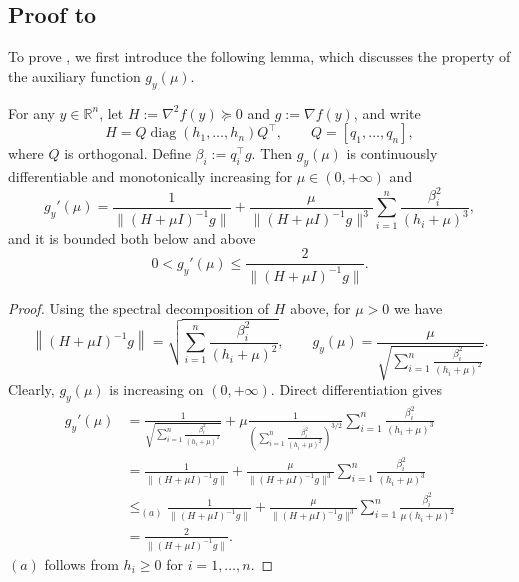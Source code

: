 \documentclass{article}
\begin{document}
\subsection*{Proof to }
To prove , we first introduce the following lemma, which discusses the property of the auxiliary function $g_y(\mu)$.
\begin{lemma}
    \label{lem.property g}
    For any $y\in \mathbb{R}^n$, let $H:=\nabla^2 f(y)\succeq0$ and $g:=\nabla f(y)$, and write
    \[
        H=Q\operatorname{diag}(h_1,\ldots,h_n)Q^\top,
        \qquad Q=[q_1,\ldots,q_n],
    \]
    where $Q$ is orthogonal. Define $\beta_i:=q_i^\top g$. Then $g_y(\mu)$ is continuously differentiable and monotonically increasing for $\mu \in \left(0,+\infty\right)$ and
    \begin{equation}
        \label{eq.derivative}
        g_y'(\mu) = \frac{1}{\|\left(H+\mu I\right)^{-1}g\|}+\frac{\mu}{\|\left(H+\mu I\right)^{-1}g\|^3}\sum_{i=1}^n\frac{\beta_i^2}{(h_i+\mu)^3},
    \end{equation}
    and it is bounded both below and above
    \begin{equation}
        \label{eq.derivative bound}
        0< g_y'(\mu) \leq \frac{2}{\|\left(H+\mu I\right)^{-1}g\|}.
    \end{equation}
\end{lemma}
\begin{proof}
    Using the spectral decomposition of $H$ above, for $\mu>0$ we have
    \begin{equation*}
        \left\|(H+\mu I)^{-1}g\right\|=\sqrt{\sum_{i=1}^n \frac{\beta_i^2}{(h_i+\mu)^2}}, \qquad g_y(\mu) = \frac{\mu}{\sqrt{\sum_{i=1}^n \frac{\beta_i^2}{(h_i+\mu)^2}}}.
    \end{equation*}
    Clearly, $g_y(\mu)$ is increasing on $\left(0,+\infty\right)$. Direct differentiation gives
    \begin{equation*}
        \begin{aligned}
            g_y'(\mu) & = \frac{1}{\sqrt{\sum_{i=1}^n \frac{\beta_i^2}{(h_i+\mu)^2}}}+\mu \frac{1}{\left(\sum_{i=1}^n \frac{\beta_i^2}{(h_i+\mu)^2}\right)^{3/2}}\sum_{i=1}^n\frac{\beta_i^2}{(h_i+\mu)^3} \\
                      & = \frac{1}{\|(H+\mu I)^{-1}g\|}+\frac{\mu}{\|(H+\mu I)^{-1}g\|^3}\sum_{i=1}^n\frac{\beta_i^2}{(h_i+\mu)^3} \\
                      & \leq_{(a)} \frac{1}{\|(H+\mu I)^{-1}g\|}+\frac{\mu}{\|(H+\mu I)^{-1}g\|^3}\sum_{i=1}^n\frac{\beta_i^2}{\mu(h_i+\mu)^2} \\
                      & = \frac{2}{\|(H+\mu I)^{-1}g\|}.
        \end{aligned}
    \end{equation*}
    $(a)$ follows from $h_i\geq0$ for $i=1,\ldots,n$.
\end{proof}
\end{document}
